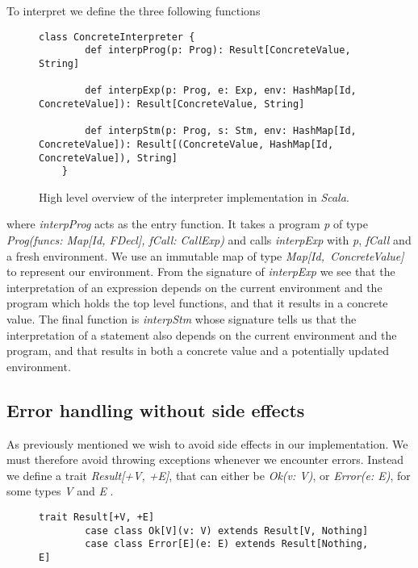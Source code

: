 To interpret \explanguage we define the three following functions

\begin{figure}[!h]
	\begin{lstlisting}[style=simple]
	class ConcreteInterpreter {
		def interpProg(p: Prog): Result[ConcreteValue, String]
			
		def interpExp(p: Prog, e: Exp, env: HashMap[Id, ConcreteValue]): Result[ConcreteValue, String]
						  
		def interpStm(p: Prog, s: Stm, env: HashMap[Id, ConcreteValue]): Result[(ConcreteValue, HashMap[Id, ConcreteValue]), String]
	}
	\end{lstlisting}
	\caption{High level overview of the interpreter implementation in \textsl{Scala}.}
\end{figure}

 \noindent where \textsl{interpProg} acts as the entry function. It takes a program \textsl{p} of type \textsl{Prog(funcs: Map[Id, FDecl], fCall: CallExp)} and calls \textsl{interpExp} with \textsl{p}, \textsl{fCall} and a fresh environment. We use an immutable map of type \mbox{\textsl{Map[Id, ConcreteValue]}} to represent our environment. From the signature of \textsl{interpExp} we see that the interpretation of an expression depends on the current environment and the program which holds the top level functions, and that it results in a concrete value. The final function is \textsl{interpStm} whose signature tells us that the interpretation of a statement also depends on the current environment and the program, and that results in both a concrete value and a potentially updated environment. 

\subsection{Error handling without side effects}
 As previously mentioned we wish to avoid side effects in our implementation. We must therefore avoid throwing exceptions whenever we encounter errors.
 Instead we define a trait \textsl{Result[+V, +E]}, that can either be \textsl{Ok(v: V)},  or \textsl{Error(e: E)}, for some types \textsl{V} and \textsl{E} \cite{Chiusano:2014:FPS:2688794}.

\begin{figure}[!h]
	\begin{lstlisting}[style=simple]
		trait Result[+V, +E]
		case class Ok[V](v: V) extends Result[V, Nothing]
		case class Error[E](e: E) extends Result[Nothing, E]
	\end{lstlisting}
\end{figure}

